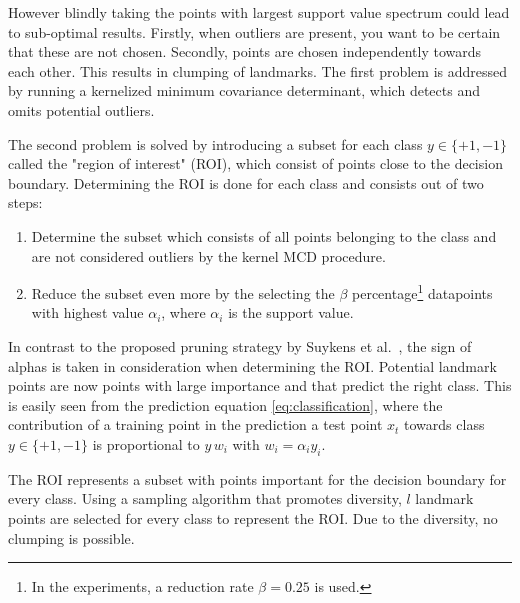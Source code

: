 \documentclass[preprint,12pt]{elsarticle}
\begin{document}
	However blindly taking the points with largest support value spectrum could lead to sub-optimal results. Firstly, when outliers are present, you want to be certain that these are not chosen. Secondly, points are chosen independently towards each other. This results in clumping of landmarks. The first problem is addressed by running a kernelized minimum covariance determinant, which detects and omits potential outliers. 
	
	The second problem is solved by introducing a subset for each class \newline $y \in \{+1,-1\}$ called the "region of interest" (ROI), which consist of points close to the decision boundary. Determining the ROI is done for each class and consists out of two steps:
	\begin{enumerate}
		\item Determine the subset which consists of all points belonging to the class and are not considered outliers by the kernel MCD procedure.
		\item Reduce the subset even more by the selecting the $\beta$ percentage\footnote{In the experiments, a reduction rate $\beta = 0.25$ is used.} datapoints with highest value $\alpha_i$, where $\alpha_i$ is the support value. 
	\end{enumerate}
	In contrast to the proposed pruning strategy by Suykens et al.~\cite{suykens2000sparse}, the sign of alphas is taken in consideration when determining the ROI. Potential landmark points are now points with large importance and that predict the right class. This is easily seen from the prediction equation \eqref{eq:classification}, where the contribution of a training point in the prediction a test point $x_t$ towards class $y \in \{+1,-1\}$ is proportional to $y \, w_i$ with $w_i = \alpha_iy_i$.
	
	The ROI represents a subset with points important for the decision boundary for every class. Using a sampling algorithm that promotes diversity, $l$ landmark points are selected for every class to represent the ROI. Due to the diversity, no clumping is possible.
	
\end{document}
